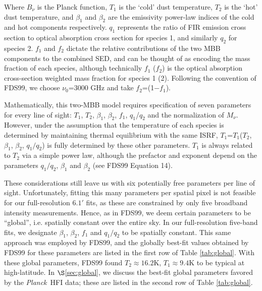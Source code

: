 \documentclass{emulateapj}
\newcommand{\PLANCK}{{\it Planck}}
\begin{document}
Where $B_{\nu}$ is the Planck function, $T_1$ is the `cold' dust temperature, 
$T_2$ is the `hot' dust temperature, and $\beta_1$ and $\beta_2$ are the
emissivity power-law indices of the cold and hot components respectively. 
$q_1$ represents the ratio of FIR emission cross section to optical absorption 
cross section for species 1, and similarly $q_2$ for species 2. $f_1$ and 
$f_2$ dictate the relative contributions of the two MBB components to the
combined SED, and can be thought of as encoding the mass fraction of each 
species, although technically $f_1$ ($f_2$) is the optical absorption 
cross-section weighted mass fraction for species 1 (2). Following the 
convention of FDS99, we choose $\nu_0$=3000 GHz and take $f_2$=(1$-$$f_1$).

Mathematically, this two-MBB model requires specification of seven 
parameters for every line of sight: $T_1$, $T_2$, $\beta_1$, $\beta_2$, $f_1$, 
$q_1$/$q_2$ and the normalization of $M_{\nu}$. However, under the 
assumption that the temperature of each species is determined by maintaining 
thermal equilibrium with the same ISRF, $T_1$=$T_1$($T_2$, $\beta_1$, 
$\beta_2$, $q_1/q_2$) is fully determined by these other parameters. $T_1$ is 
always related to $T_2$ via a simple power law, although the prefactor and 
exponent depend on the parameters $q_1/q_2$, $\beta_1$ and $\beta_2$ (see FDS99
Equation 14).


These considerations still leave us with six potentially free parameters per 
line of sight. Unfortunately, fitting this many parameters per spatial pixel is
not feasible for our full-resolution $6.1$$'$ fits, as these are constrained by
only five broadband intensity measurements. Hence, as in FDS99, we deem certain
 parameters to be ``global'', i.e. spatially constant over the entire sky. In 
our full-resolution five-band fits, we designate $\beta_1$, $\beta_2$, $f_1$ 
and $q_1/q_2$ to be spatially constant. This same approach was employed by 
FDS99, and the globally best-fit values obtained by FDS99 for these parameters 
are listed in the first row of Table \ref{tab:global}. With these global 
parameters, FDS99 found $T_2$$\approx$$16.2$K, $T_1$$\approx$$9.4$K to be 
typical at high-latitude. In $\S$\ref{sec:global}, we discuss the best-fit 
global parameters favored by the \PLANCK~HFI data; these are listed in the 
second row of Table \ref{tab:global}.

\end{document}
